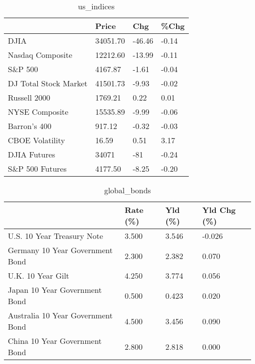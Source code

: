 \documentclass{article}%
\begin{document}
%


\begin{table}[htbp]%
\caption{us\_indices}%
\centering%
\begin{adjustbox}{width=1\textwidth}%
\begin{tabular}{llll}
\toprule
                      &    Price &    Chg &  \%Chg \\
\midrule
                 DJIA & 34051.70 & -46.46 & -0.14 \\
     Nasdaq Composite & 12212.60 & -13.99 & -0.11 \\
              S\&P 500 &  4167.87 &  -1.61 & -0.04 \\
DJ Total Stock Market & 41501.73 &  -9.93 & -0.02 \\
         Russell 2000 &  1769.21 &   0.22 &  0.01 \\
       NYSE Composite & 15535.89 &  -9.99 & -0.06 \\
         Barron's 400 &   917.12 &  -0.32 & -0.03 \\
      CBOE Volatility &    16.59 &   0.51 &  3.17 \\
         DJIA Futures &    34071 &    -81 & -0.24 \\
      S\&P 500 Futures &  4177.50 &  -8.25 & -0.20 \\
\bottomrule
\end{tabular}
%
\end{adjustbox}%
\end{table}

%


\begin{table}[htbp]%
\caption{global\_bonds}%
\centering%
\begin{adjustbox}{width=1\textwidth}%
\begin{tabular}{llll}
\toprule
                                  & Rate (\%) & Yld (\%) & Yld Chg (\%) \\
\midrule
       U.S. 10 Year Treasury Note &    3.500 &   3.546 &      -0.026 \\
  Germany 10 Year Government Bond &    2.300 &   2.382 &       0.070 \\
                U.K. 10 Year Gilt &    4.250 &   3.774 &       0.056 \\
    Japan 10 Year Government Bond &    0.500 &   0.423 &       0.020 \\
Australia 10 Year Government Bond &    4.500 &   3.456 &       0.090 \\
    China 10 Year Government Bond &    2.800 &   2.818 &       0.000 \\
\bottomrule
\end{tabular}
%
\end{adjustbox}%
\end{table}
\end{document}

